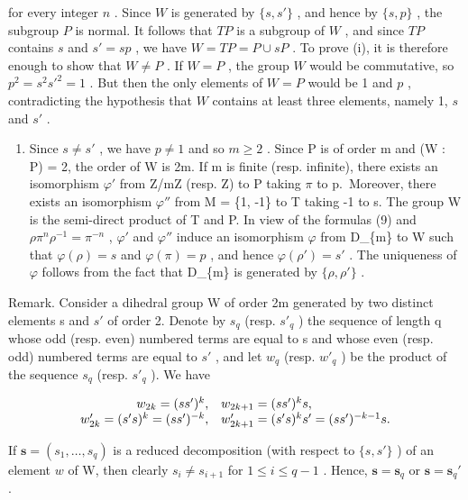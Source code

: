 for every integer \(n\) . Since \(W\) is generated by \(\{s, s'\}\) , and hence by \(\{s, p\}\) , the subgroup \(P\) is normal. It follows that \(TP\) is a subgroup of \(W\) , and since \(TP\) contains \(s\) and \(s' = sp\) , we have \(W = TP = P \cup sP\) . To prove (i), it is therefore enough to show that \(W \neq P\) . If \(W = P\) , the group \(W\) would be commutative, so \(p^2 = s^2 s'^2 = 1\) . But then the only elements of \(W = P\) would be 1 and \(p\) , contradicting the hypothesis that \(W\) contains at least three elements, namely 1, \(s\) and \(s'\) .

\begin{enumerate}
\def\labelenumi{(\roman{enumi})}
\setcounter{enumi}{1}
\tightlist
\item
  Since \(s \neq s'\) , we have \(p \neq 1\) and so \(m \geqslant 2\) . Since P is of order m and (W : P) = 2, the order of W is 2m. If m is finite (resp. infinite), there exists an isomorphism \(\varphi'\) from Z/mZ (resp. Z) to P taking \(\pi\) to p.~Moreover, there exists an isomorphism \(\varphi''\) from M = \{1, -1\} to T taking -1 to s. The group W is the semi-direct product of T and P. In view of the formulas (9) and \(\rho\pi^{n}\rho^{-1} = \pi^{-n}\) , \(\varphi'\) and \(\varphi''\) induce an isomorphism \(\varphi\) from D\_\{m\} to W such that \(\varphi(\rho) = s\) and \(\varphi(\pi) = p\) , and hence \(\varphi(\rho') = s'\) . The uniqueness of \(\varphi\) follows from the fact that D\_\{m\} is generated by \(\{\rho, \rho'\}\) .
\end{enumerate}

Remark. Consider a dihedral group W of order 2m generated by two distinct elements s and \(s'\) of order 2. Denote by \(s_{q}\) (resp. \(s'_{q}\) ) the sequence of length q whose odd (resp. even) numbered terms are equal to s and whose even (resp. odd) numbered terms are equal to \(s'\) , and let \(w_{q}\) (resp. \(w'_{q}\) ) be the product of the sequence \(s_{q}\) (resp. \(s'_{q}\) ). We have

\[
\begin{array}{r l} w _ {2 k} = (s s ^ {\prime}) ^ {k}, & w _ {2 k + 1} = (s s ^ {\prime}) ^ {k} s, \\ w _ {2 k} ^ {\prime} = (s ^ {\prime} s) ^ {k} = (s s ^ {\prime}) ^ {- k}, & w _ {2 k + 1} ^ {\prime} = (s ^ {\prime} s) ^ {k} s ^ {\prime} = (s s ^ {\prime}) ^ {- k - 1} s. \end{array}
\]

If \(\mathbf{s} = (s_1, \ldots, s_q)\) is a reduced decomposition (with respect to \(\{s, s'\}\) ) of an element \(w\) of W, then clearly \(s_i \neq s_{i+1}\) for \(1 \leqslant i \leqslant q-1\) . Hence, \(\mathbf{s} = \mathbf{s}_q\) or \(\mathbf{s} = \mathbf{s}_q'\) .


